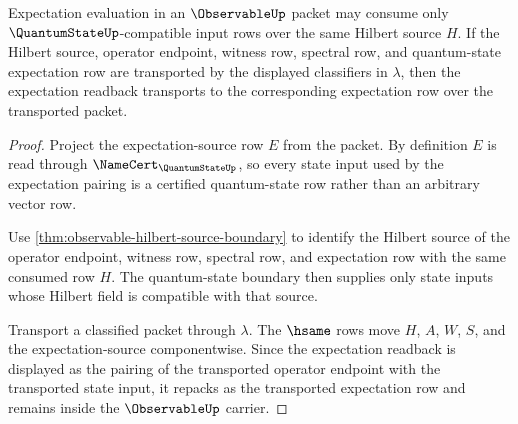 \begin{theorem}
\label{thm:observable-quantumstate-expectation-boundary}
Expectation evaluation in an $\ObservableUp$ packet may consume only
$\QuantumStateUp$-compatible input rows over the same Hilbert source $H$.
If the Hilbert source, operator endpoint, witness row, spectral row, and
quantum-state expectation row are transported by the displayed classifiers in
$\lambda$, then the expectation readback transports to the corresponding
expectation row over the transported packet.
\end{theorem}
\begin{proof}
Project the expectation-source row $E$ from the packet. By definition $E$ is
read through $\NameCert_{\QuantumStateUp}$, so every state input used by the
expectation pairing is a certified quantum-state row rather than an arbitrary
vector row.

Use \autoref{thm:observable-hilbert-source-boundary} to identify the Hilbert
source of the operator endpoint, witness row, spectral row, and expectation
row with the same consumed row $H$. The quantum-state boundary then supplies
only state inputs whose Hilbert field is compatible with that source.

Transport a classified packet through $\lambda$. The $\hsame$ rows move $H$,
$A$, $W$, $S$, and the expectation-source componentwise. Since the expectation
readback is displayed as the pairing of the transported operator endpoint
with the transported state input, it repacks as the transported expectation
row and remains inside the $\ObservableUp$ carrier.
\end{proof}

